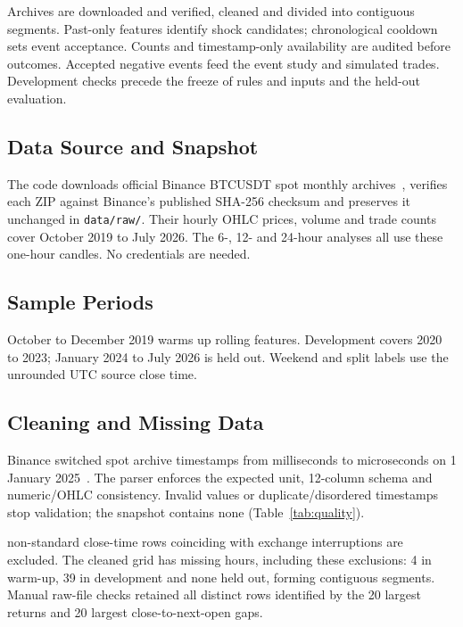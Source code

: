 \documentclass[11pt,a4paper]{article}
\begin{document}
Archives are downloaded and verified, cleaned and divided into contiguous segments. Past-only features identify shock candidates; chronological cooldown sets event acceptance. Counts and timestamp-only availability are audited before outcomes. Accepted negative events feed the event study and simulated trades. Development checks precede the freeze of rules and inputs and the held-out evaluation.

\subsection{Data Source and Snapshot}

The code downloads \SourceFiles{} official Binance BTCUSDT spot monthly archives~\cite{binance}, verifies each ZIP against Binance's published SHA-256 checksum and preserves it unchanged in \texttt{data/raw/}. Their hourly OHLC prices, volume and trade counts cover October 2019 to July 2026. The 6-, 12- and 24-hour analyses all use these one-hour candles. No credentials are needed.

\subsection{Sample Periods}

October to December 2019 warms up rolling features. Development covers 2020 to 2023; January 2024 to July 2026 is held out. Weekend and split labels use the unrounded UTC source close time.

\subsection{Cleaning and Missing Data}

Binance switched spot archive timestamps from milliseconds to microseconds on 1 January 2025~\cite{binance}. The parser enforces the expected unit, 12-column schema and numeric/OHLC consistency. Invalid values or duplicate/disordered timestamps stop validation; the snapshot contains none (Table~\ref{tab:quality}).

\ExcludedRows{} non-standard close-time rows coinciding with exchange interruptions are excluded. The cleaned grid has \MissingHours{} missing hours, including these exclusions: 4 in warm-up, 39 in development and none held out, forming \Segments{} contiguous segments. Manual raw-file checks retained all \AnomalyCandidates{} distinct rows identified by the 20 largest returns and 20 largest close-to-next-open gaps.
\end{document}
